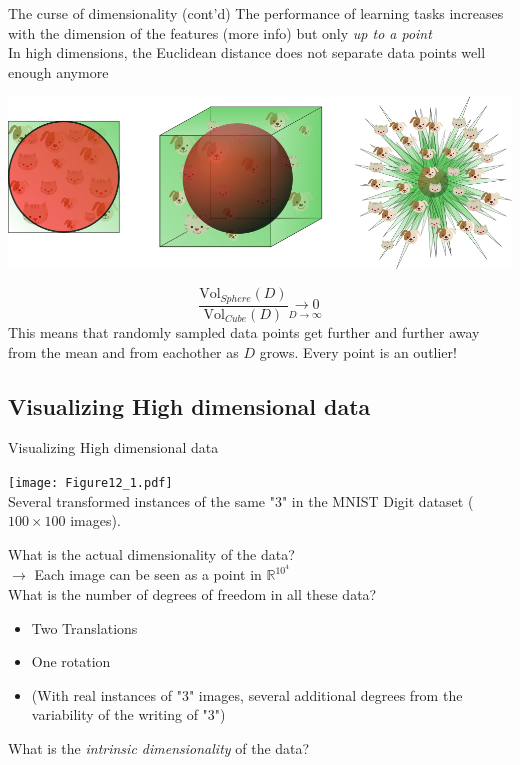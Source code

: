 \documentclass{beamer}
\begin{document}
\begin{frame}{The curse of dimensionality (cont'd)}
The performance of learning tasks increases with the dimension of the features (more info) but only \emph{up to a point}\\
\vspace{0.2cm}
In high dimensions, the Euclidean distance does not separate data points well enough anymore

\begin{center}
\includegraphics[scale=0.25]{ratio_volume.png}
\end{center}
\begin{equation*}
\frac{\textrm{Vol}_{Sphere}(D)}{\textrm{Vol}_{Cube}(D)}  \underset{D\rightarrow \infty}{\rightarrow 0}
\end{equation*}
This means that randomly sampled data points get further and further away from the mean and from eachother as $D$ grows. Every point is an outlier!
\end{frame}

\subsection{Visualizing High dimensional data}
\begin{frame}{Visualizing High dimensional data}
\begin{center}
\texttt{[image: Figure12\_1.pdf]}\\
\tiny{Several transformed instances of the same "3" in the MNIST Digit dataset} ($100\times100$ images).
\end{center}

What is the actual dimensionality of the data?\\
$\rightarrow$ Each image can be seen as a point in $\mathbb{R}^{10^{4}}$\\
\vspace{0.5cm}
What is the number of degrees of freedom in all these data?\\
\begin{itemize}
\item Two Translations
\item One rotation
\item (With real instances of "3" images, several additional degrees from the variability of the writing of "3")
\end{itemize}
What is the \emph{intrinsic dimensionality} of the data?\\

\end{frame}
\end{document}
